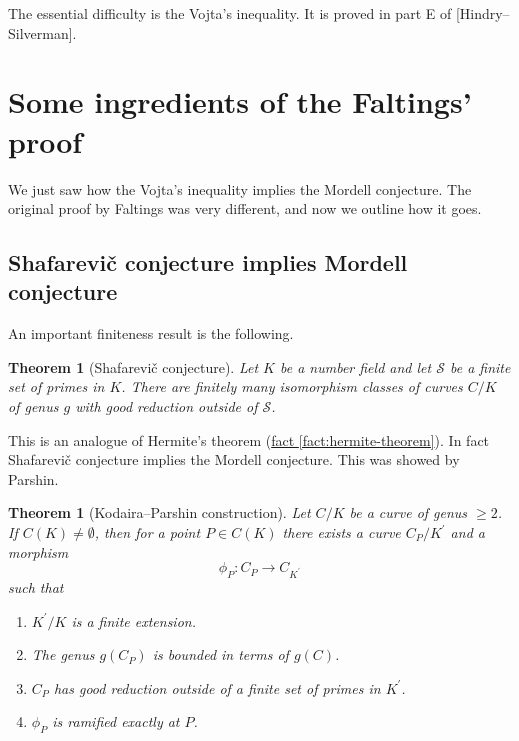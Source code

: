 \documentclass{article}
\newcommand{\refref}[2]{\hyperref[#2]{#1 \ref*{#2}}}
\newtheorem{theorem}[proposition]{Theorem}
\theoremstyle{definition}
\begin{document}
\vspace{1em}

\noindent\frownie\frownie\frownie{} The essential difficulty is the Vojta's
inequality. It is proved in part E of [Hindry--Silverman].

\section{Some ingredients of the Faltings' proof}
\label{section:faltings}

We just saw how the Vojta's inequality implies the Mordell conjecture. The
original proof by Faltings was very different, and now we outline how it goes.

\subsection*{Shafarevi\v{c} conjecture implies Mordell conjecture}

An important finiteness result is the following.

\begin{theorem}[Shafarevi\v{c} conjecture]
  Let $K$ be a number field and let $\mathcal{S}$ be a finite set of primes in
  $K$.  There are finitely many isomorphism classes of curves $C/K$ of genus $g$
  with good reduction outside of $\mathcal{S}$.
\end{theorem}

This is an analogue of Hermite's theorem (\refref{fact}{fact:hermite-theorem}).
In fact Shafarevi\v{c} conjecture implies the Mordell conjecture. This was
showed by Parshin.

\begin{theorem}[Kodaira--Parshin construction]
  Let $C/K$ be a curve of genus $\ge 2$. If $C (K) \ne \emptyset$, then for a
  point $P \in C (K)$ there exists a curve $C_P/K^\prime$ and a morphism
  $$\phi_P\colon C_P \to C_{K^\prime}$$
  such that
  \begin{enumerate}
  \item $K^\prime/K$ is a finite extension.

  \item The genus $g (C_P)$ is bounded in terms of $g (C)$.

  \item $C_P$ has good reduction outside of a finite set of primes in
    $K^\prime$.

  \item $\phi_P$ is ramified exactly at $P$.
  \end{enumerate}
\end{theorem}
\end{document}
